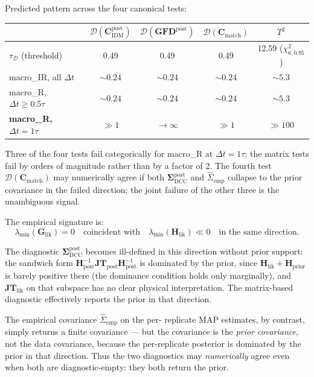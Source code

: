 \documentclass[11pt]{article}
\begin{document}
Predicted pattern across the four canonical tests:
\begin{center}
\begin{tabular}{lcccc}
\hline
 & $\mathcal D(\mathbf C_{\mathrm{IDM}}^{\mathrm{post}})$
 & $\mathcal D(\mathbf{GFD}^{\mathrm{post}})$
 & $\mathcal D(\mathbf C_{\mathrm{match}})$
 & $T^2$ \\
\hline
$\tau_{\mathcal D}$ (threshold) & 0.49 & 0.49 & 0.49 & 12.59 ($\chi^2_{6,0.95}$) \\
\hline
macro\_IR, all $\Delta t$ & $\sim 0.24$ & $\sim 0.24$ & $\sim 0.24$ & $\sim 5.3$ \\
macro\_R, $\Delta t \geq 0.5\tau$ & $\sim 0.24$ & $\sim 0.24$ & $\sim 0.24$ & $\sim 5.3$ \\
\textbf{macro\_R, $\Delta t = 1\tau$} & $\gg 1$ & $\to \infty$ & $\gg 1$ & $\gg 100$ \\
\hline
\end{tabular}
\end{center}

Three of the four tests fail categorically for macro\_R at
$\Delta t = 1\tau$; the matrix tests fail by orders of magnitude rather
than by a factor of 2. The fourth test $\mathcal D(\mathbf C_{\mathrm{match}})$
may numerically agree if both $\boldsymbol\Sigma_{\mathrm{DCC}}^{\mathrm{post}}$
and $\widehat\Sigma_{\mathrm{emp}}$ collapse to the prior covariance
in the failed direction; the joint failure of the other three is the
unambiguous signal.

The empirical signature is:
\begin{equation}
\boxed{\quad
\lambda_{\min}(\mathbf G_{\mathrm{lik}}) = 0
\quad\text{coincident with}\quad
\lambda_{\min}(\mathbf H_{\mathrm{lik}}) \ll 0
\quad\text{in the same direction.}
\quad}
\label{eq:av-fourth-regime-signature}
\end{equation}

The diagnostic $\boldsymbol\Sigma_{\mathrm{DCC}}^{\mathrm{post}}$
becomes ill-defined in this direction without prior support: the
sandwich form
$\mathbf H^{-1}_{\mathrm{post}}\mathbf{JT}_{\mathrm{post}}\mathbf H^{-1}_{\mathrm{post}}$
is dominated by the prior, since
$\mathbf H_{\mathrm{lik}} + \mathbf H_{\mathrm{prior}}$ is barely
positive there (the dominance condition holds only marginally), and
$\mathbf{JT}_{\mathrm{lik}}$ on that subspace has no clear physical
interpretation. The matrix-based diagnostic effectively reports the
prior in that direction.

The empirical covariance $\widehat\Sigma_{\mathrm{emp}}$ on the per-
replicate MAP estimates, by contrast, simply returns a finite
covariance --- but the covariance is the \emph{prior covariance}, not
the data covariance, because the per-replicate posterior is dominated
by the prior in that direction. Thus the two diagnostics may
\emph{numerically} agree even when both are diagnostic-empty: they both
return the prior.
\end{document}
